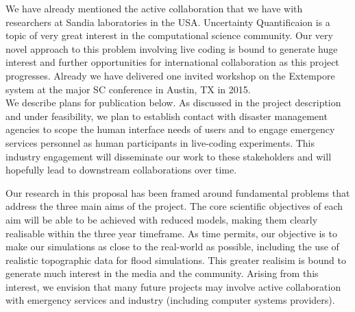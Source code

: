 

%

%

%




%

%



%

We have already mentioned the active collaboration that we have with researchers at Sandia laboratories in the USA. Uncertainty Quantificaion is a topic of very great interest in the computational science community. Our very novel approach to this problem involving live coding is bound to generate huge interest and further opportunities for international collaboration as this project progresses. Already we have delivered one invited workshop on the Extempore system at the major SC conference in Austin, TX in 2015. \\

We describe plans for publication below. 
As discussed in the project description and under feasibility, we plan to establish contact with disaster management agencies to scope the human interface needs of users and to engage emergency services personnel as human participants in live-coding experiments. This industry engagement will disseminate our work to these stakeholders and will hopefully lead to downstream collaborations over time.

Our research in this proposal has been framed around fundamental problems that address the three main aims of the project. The core scientific objectives of each aim will be able to be achieved with reduced models, making them clearly realisable within the three year timeframe. As time permits, our objective is to make our simulations as close to the real-world as possible, including the use of realistic topographic data for flood simulations. This greater realisim is bound to generate much interest in the media and the community. Arising from this interest, we envision that many future projects may involve active collaboration with emergency services and industry (including computer systems providers). 


%

